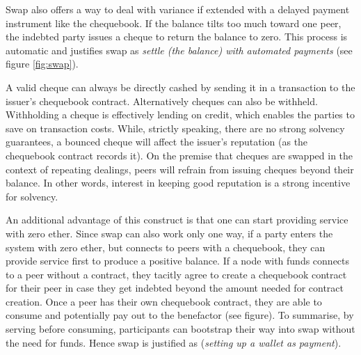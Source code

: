 \documentclass[a4paper,10pt]{article}
\begin{document}
Swap also offers a way to deal with variance if extended with a delayed payment instrument
like the chequebook.
If the balance tilts too much toward one peer, the indebted
party issues a cheque to return the balance to zero.
This process is automatic and justifies swap as \emph{settle (the balance) with automated payments}
(see figure \ref{fig:swap}).

A valid cheque can always be directly cashed by sending it
in a transaction to the issuer's chequebook contract. Alternatively cheques can also be withheld.
Withholding a cheque is effectively lending on credit, which enables the parties to save on
transaction costs.
While, strictly speaking, there are no strong solvency guarantees,
a bounced cheque will affect the issuer's reputation (as the chequebook contract records it).
On the premise that
cheques are swapped in the context of repeating dealings, peers will refrain from
issuing cheques beyond their balance.
In other words, interest in keeping good reputation is a strong incentive for
solvency.

An additional advantage of this construct is that one can start providing service with zero ether.
Since swap can also work only one way, if a party enters the system with zero ether,
but connects to peers with a chequebook, they can provide service first to produce a positive balance.
If a node with funds connects to a peer without a contract, they tacitly agree to
create a chequebook contract for their peer in case they get indebted beyond
the amount needed for contract creation. Once a peer has their own chequebook contract, they are able
to consume and potentially pay out to the benefactor (see figure).
To summarise, by serving before consuming, participants can
bootstrap their way into swap without the need for funds.
Hence swap is justified as (\emph{setting up a wallet as payment}).
\end{document}
